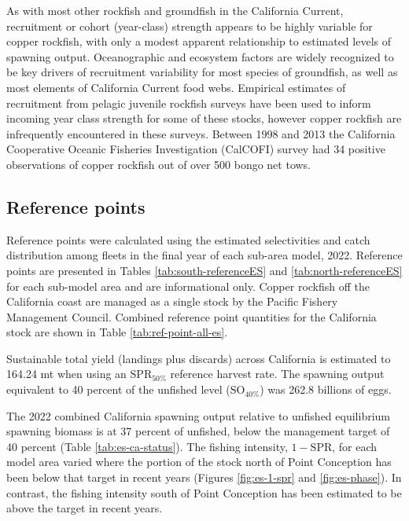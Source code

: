 \documentclass[11pt,
  letterpaper,
]{article}
\begin{document}
As with most other rockfish and groundfish in the California Current, recruitment or cohort (year-class) strength appears to be highly variable for copper rockfish, with only a modest apparent relationship to estimated levels of spawning output. Oceanographic and ecosystem factors are widely recognized to be key drivers of recruitment variability for most species of groundfish, as well as most elements of California Current food webs. Empirical estimates of recruitment from pelagic juvenile rockfish surveys have been used to inform incoming year class strength for some of these stocks, however copper rockfish are infrequently encountered in these surveys. Between 1998 and 2013 the California Cooperative Oceanic Fisheries Investigation (CalCOFI) survey had 34 positive observations of copper rockfish out of over 500 bongo net tows.

\subsection*{Reference points}\label{reference-points}

Reference points were calculated using the estimated selectivities and catch distribution among fleets in the final year of each sub-area model, 2022. Reference points are presented in Tables \ref{tab:south-referenceES} and \ref{tab:north-referenceES} for each sub-model area and are informational only. Copper rockfish off the California coast are managed as a single stock by the Pacific Fishery Management Council. Combined reference point quantities for the California stock are shown in Table \ref{tab:ref-point-all-es}.

Sustainable total yield (landings plus discards) across California is estimated to 164.24 mt when using an \(\text{SPR}_{50\%}\) reference harvest rate. The spawning output equivalent to 40 percent of the unfished level (\(\text{SO}_{40\%}\)) was 262.8 billions of eggs.

The 2022 combined California spawning output relative to unfished equilibrium spawning biomass is at 37 percent of unfished, below the management target of 40 percent (Table \ref{tab:es-ca-status}). The fishing intensity, \(1-\text{SPR}\), for each model area varied where the portion of the stock north of Point Conception has been below that target in recent years (Figures \ref{fig:es-1-spr} and \ref{fig:es-phase}). In contrast, the fishing intensity south of Point Conception has been estimated to be above the target in recent years.
\end{document}
